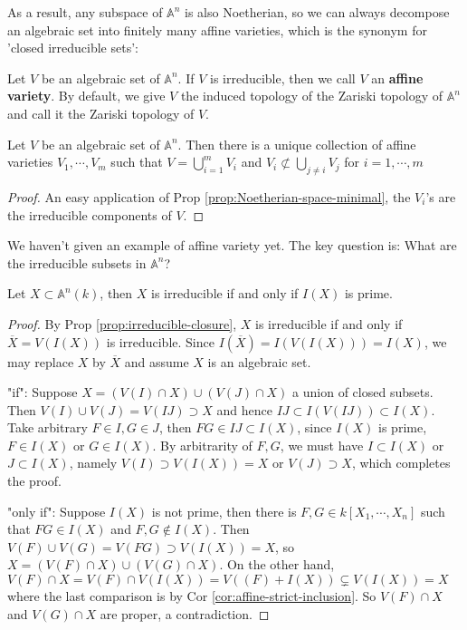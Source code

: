 \documentclass{note-eng}
\begin{document}
As a result, any subspace of $\mathbb{A}^n$ is also Noetherian, so we can always decompose an algebraic set into finitely many affine varieties, which is the synonym for 'closed irreducible sets':

\begin{definition}
    Let $V$ be an algebraic set of $\mathbb{A}^n$. If $V$ is irreducible, then we call $V$ an \textbf{affine variety}. By default, we give $V$ the induced topology of the Zariski topology of $\mathbb{A}^n$ and call it the Zariski topology of $V$.
\end{definition}

\begin{proposition}
    Let $V$ be an algebraic set of $\mathbb{A}^n$. Then there is a unique collection of affine varieties $V_1, \cdots, V_m$ such that $V = \bigcup\limits_{i = 1}^{m} V_i$ and $V_i \not \subset \bigcup\limits_{j \ne i} V_j$ for $i = 1, \cdots, m$
\end{proposition}

\begin{proof}
    An easy application of Prop \ref{prop:Noetherian-space-minimal}, the $V_i$'s are the irreducible components of $V$.
\end{proof}

We haven't given an example of affine variety yet. The key question is: What are the irreducible subsets in $\mathbb{A}^n$?

\begin{proposition} \label{prop:affine-irreducible-prime}
    Let $X \subset \mathbb{A}^n(k)$, then $X$ is irreducible if and only if $I(X)$ is prime.
\end{proposition}

\begin{proof}
    By Prop \ref{prop:irreducible-closure}, $X$ is irreducible if and only if $\overline{X} = V(I(X))$ is irreducible. Since $I(\overline{X}) = I(V(I(X))) = I(X)$, we may replace $X$ by $\overline{X}$ and assume $X$ is an algebraic set.
    
    "if": Suppose $X = (V(I) \cap X) \cup (V(J) \cap X)$ a union of closed subsets. Then $V(I) \cup V(J) = V(IJ) \supset X$ and hence $IJ \subset I(V(IJ)) \subset I(X)$. Take arbitrary $F \in I, G \in J$, then $FG \in IJ \subset I(X)$, since $I(X)$ is prime, $F \in I(X)$ or $G \in I(X)$. By arbitrarity of $F, G$, we must have $I \subset I(X)$ or $J \subset I(X)$, namely $V(I) \supset V(I(X)) = X$ or $V(J) \supset X$, which completes the proof.

    "only if": Suppose $I(X)$ is not prime, then there is $F, G \in k[X_1, \cdots, X_n]$ such that $FG \in I(X)$ and $F, G \notin I(X)$. Then $V(F) \cup V(G) = V(FG) \supset V(I(X)) = X$, so $X = (V(F) \cap X) \cup (V(G) \cap X)$. On the other hand, $V(F) \cap X = V(F) \cap V(I(X)) = V((F) + I(X)) \subsetneq V(I(X)) = X$ where the last comparison is by Cor \ref{cor:affine-strict-inclusion}. So $V(F) \cap X$ and $V(G) \cap X$ are proper, a contradiction.
\end{proof}
\end{document}
